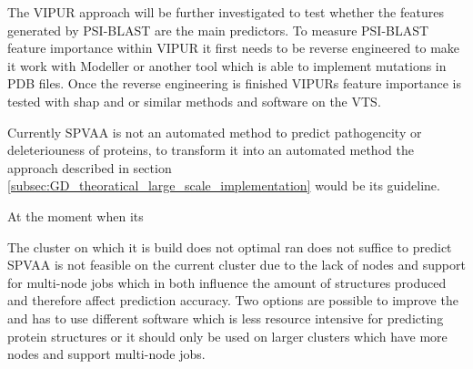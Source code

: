The VIPUR approach will be further investigated to test whether the features generated by PSI-BLAST are the main predictors. To measure PSI-BLAST feature importance within VIPUR it first needs to be reverse engineered to make it work with Modeller or another tool which is able to implement mutations in PDB files. Once the reverse engineering is finished VIPURs feature importance is tested with shap\cite{} and or similar methods and software on the VTS.

Currently SPVAA is not an automated method to predict pathogencity or deleteriouness of proteins, to transform it into an automated method the approach described in section \ref{subsec:GD_theoratical_large_scale_implementation} would be its guideline. 



At the moment when its 


The cluster on which it is build does not optimal ran does not suffice to predict 
SPVAA is not feasible on the current cluster due to the lack of nodes and support for multi-node jobs which in both influence the amount of structures produced and therefore affect prediction accuracy. Two options are possible to improve the and has to use different software which is less resource intensive for predicting protein structures or it should only be used on larger clusters which have more nodes and support multi-node jobs. 



